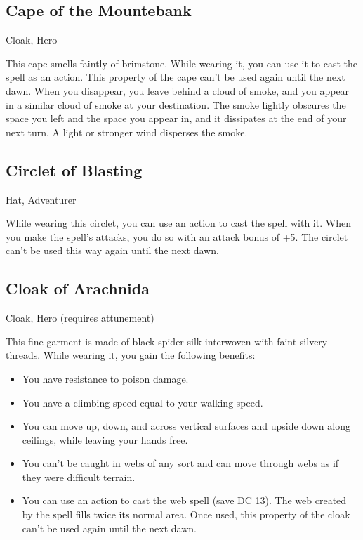 \subsection{Cape of the Mountebank}
Cloak, Hero

This cape smells faintly of brimstone. While wearing it, you can use it to cast the  spell as an action. This property of the cape can't be used again until the next dawn. When you disappear, you leave behind a cloud of smoke, and you appear in a similar cloud of smoke at your destination. The smoke lightly obscures the space you left and the space you appear in, and it dissipates at the end of your next turn. A light or stronger wind disperses the smoke.

\subsection{Circlet of Blasting}
Hat, Adventurer

While wearing this circlet, you can use an action to cast the  spell with it. When you make the spell's attacks, you do so with an attack bonus of +5. The circlet can't be used this way again until the next dawn.

\subsection{Cloak of Arachnida}
Cloak, Hero (requires attunement) 

This fine garment is made of black spider-silk interwoven with faint silvery threads. While wearing it, you gain the following benefits:
\begin{itemize}
 \item You have resistance to poison damage.
 \item You have a climbing speed equal to your walking speed.
 \item You can move up, down, and across vertical surfaces and upside down along ceilings, while leaving your hands free.
 \item You can't be caught in webs of any sort and can move through webs as if they were difficult terrain.
 \item You can use an action to cast the web spell (save DC 13). The web created by the spell fills twice its normal area. Once used, this property of the cloak can't be used again until the next dawn.
\end{itemize}

